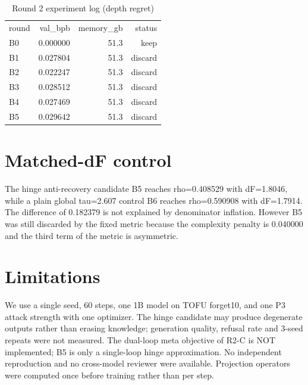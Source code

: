 \documentclass{article}
\begin{document}
\begin{table}[h]
\caption{Round 2 experiment log (depth regret)}
\label{tab:r2}
\begin{tabular}{lrrr}
round & val\_bpb & memory\_gb & status \\
B0 & 0.000000 & 51.3 & keep \\
B1 & 0.027804 & 51.3 & discard \\
B2 & 0.022247 & 51.3 & discard \\
B3 & 0.028512 & 51.3 & discard \\
B4 & 0.027469 & 51.3 & discard \\
B5 & 0.029642 & 51.3 & discard \\
\end{tabular}
\end{table}

\section{Matched-dF control}
The hinge anti-recovery candidate B5 reaches rho=0.408529 with dF=1.8046, while
a plain global tau=2.607 control B6 reaches rho=0.590908 with dF=1.7914.
The difference of 0.182379 is not explained by denominator inflation.
However B5 was still discarded by the fixed metric because the complexity
penalty is 0.040000 and the third term of the metric is asymmetric.

\section{Limitations}
We use a single seed, 60 steps, one 1B model on TOFU forget10, and one P3 attack
strength with one optimizer. The hinge candidate may produce degenerate outputs
rather than erasing knowledge; generation quality, refusal rate and 3-seed
repeats were not measured. The dual-loop meta objective of R2-C is NOT implemented;
B5 is only a single-loop hinge approximation. No independent reproduction and no
cross-model reviewer were available. Projection operators were computed once
before training rather than per step.
\end{document}
